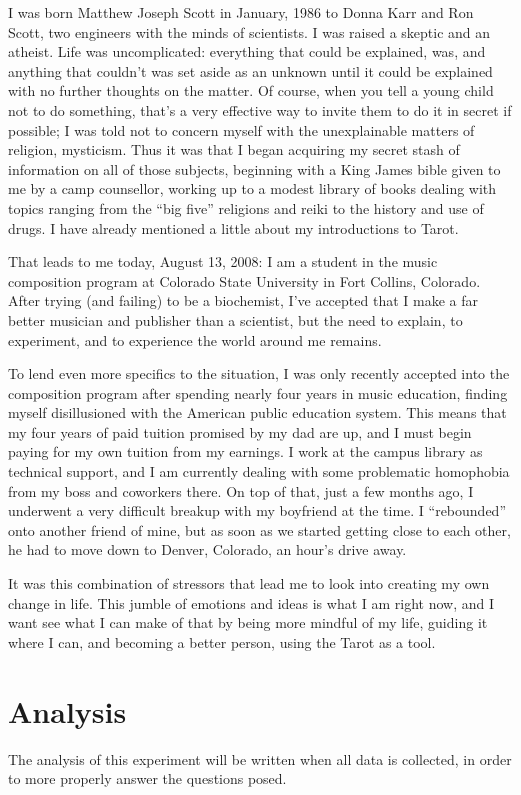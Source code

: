 \documentclass{article}
\begin{document}
I was born Matthew Joseph Scott in January, 1986 to Donna Karr and Ron
Scott, two engineers with the minds of scientists.  I was raised a
skeptic and an atheist.  Life was uncomplicated: everything that could
be explained, was, and anything that couldn't was set aside as an
unknown until it could be explained with no further thoughts on the
matter.  Of course, when you tell a young child not to do something,
that's a very effective way to invite them to do it in secret if
possible; I was told not to concern myself with the unexplainable
matters of religion, mysticism.  Thus it was that I began acquiring my
secret stash of information on all of those subjects, beginning with a
King James bible given to me by a camp counsellor, working up to a
modest library of books dealing with topics ranging from the ``big five''
religions and reiki to the history and use of drugs.  I have already mentioned a
little about my introductions to Tarot.

That leads to me today, August 13, 2008: I am a student in the music composition program
at Colorado State University in Fort Collins, Colorado.  After trying
(and failing) to be a biochemist, I've accepted that I make a far better
musician and publisher than a scientist, but the need to explain, to
experiment, and to experience the world around me remains.

To lend even more specifics to the situation, I was only recently
accepted into the composition program after spending nearly four years
in music education, finding myself disillusioned with the American
public education system.  This means that my four years of paid tuition
promised by my dad are up, and I must begin paying for my own tuition
from my earnings.  I work at the campus library as technical support,
and I am currently dealing with some problematic homophobia from my boss
and coworkers there.  On top of that, just a few months ago, I underwent
a very difficult breakup with my boyfriend at the time.  I ``rebounded''
onto another friend of mine, but as soon as we started getting close to
each other, he had to move down to Denver, Colorado, an hour's drive
away.  

It was this combination of stressors that lead me to look into
creating my own change in life.  This jumble of emotions and ideas is
what I am right now, and I want see what I can make of that by being
more mindful of my life, guiding it where I can, and becoming a better
person, using the Tarot as a tool.






\section{Analysis}
The analysis of this experiment will be written when all data is
collected, in order to more properly answer the questions posed.



\end{document}
